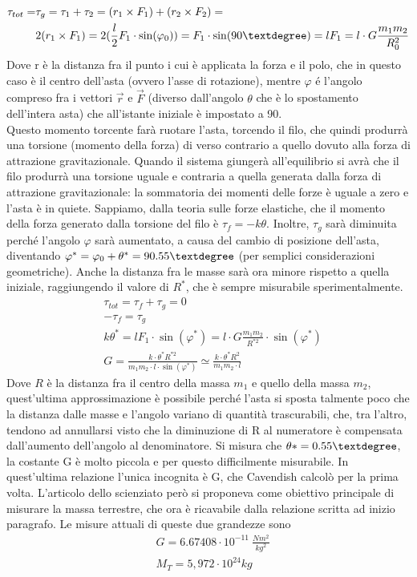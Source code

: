 \documentclass[10pt,a4paper]{article}
\begin{document}
\begin{align*}
	\tau_{tot} =& \tau_g = \tau_1 + \tau_2 = (r_1 \times F_1) +  (r_2 \times F_2) =\\
	& 2 (r_1 \times F_1)= 2(\frac{l}{2} F_1\cdot \sin(\varphi_0)) =   F_1\cdot \sin(90 \textdegree) = l F_1 =l \cdot G \frac{m_1 m_2}{R_0^{2}}
\end{align*} 
Dove r è la distanza fra il punto i cui è applicata la forza e il polo, che in questo caso è il centro dell'asta (ovvero l'asse di rotazione), mentre $\varphi$ é l'angolo compreso fra i vettori $\vec{r}$ e $\vec{F}$ (diverso dall'angolo $\theta$ che è lo spostamento dell'intera asta) che all'istante iniziale è impostato a 90\textdegree.\\
Questo momento torcente farà ruotare l'asta, torcendo il filo, che quindi produrrà una torsione (momento della forza) di verso contrario a quello dovuto alla forza di attrazione gravitazionale. Quando il sistema giungerà all'equilibrio si avrà che il filo produrrà una torsione uguale e contraria a quella generata dalla forza di attrazione gravitazionale: la sommatoria dei momenti delle forze è uguale a zero e l'asta è in quiete. Sappiamo, dalla teoria sulle forze elastiche, che il momento della forza generato dalla torsione del filo è $\tau_f = -k \theta$. Inoltre, $\tau_g$ sarà diminuita perché l'angolo $\varphi$ sarà aumentato, a causa del cambio di posizione dell'asta, diventando $\varphi^*=\varphi_0+\theta^*=90.55\textdegree$ (per semplici considerazioni geometriche). Anche la distanza fra le masse sarà ora minore rispetto a quella iniziale, raggiungendo il valore di $R^*$, che è sempre misurabile sperimentalmente.
\begin{align*}
	&\tau_ {tot} = \tau_f+\tau_g = 0 \\
	&-\tau_f = \tau_g \\
	& k \theta^* = l F_1\cdot \sin(\varphi^*) = l \cdot G \frac{m_1 m_2}{R^{*2}}\cdot \sin(\varphi^*)\\
	&G = \frac{k\cdot \theta^* R^{*2}}{m_1 m_2\cdot l\cdot \sin(\varphi^*)} \simeq \frac{k\cdot \theta^* R^{2}}{m_1 m_2\cdot l}
\end{align*}
Dove $R$ è la distanza fra il centro della massa $m_1$ e quello della massa $m_2$, quest'ultima approssimazione è possibile perché l'asta si sposta talmente poco che la distanza dalle masse e l'angolo variano di quantità trascurabili, che, tra l'altro, tendono ad annullarsi visto che la diminuzione di R al numeratore è compensata dall'aumento dell'angolo al denominatore. Si misura che $\theta* = 0.55\textdegree$, la costante G è molto piccola e per questo difficilmente misurabile. In quest'ultima relazione l'unica incognita è G, che Cavendish calcolò per la prima volta. L'articolo dello scienziato però si proponeva come obiettivo principale di misurare la massa terrestre, che ora è ricavabile dalla relazione scritta ad inizio paragrafo. Le misure attuali di queste due grandezze sono
\begin{align*}
& G = 6.67408\cdot 10^{-11}\ \frac{N m^2}{kg^2}\\
&M_T = 5,972 \cdot 10^{24} kg
\end{align*}
\end{document}
